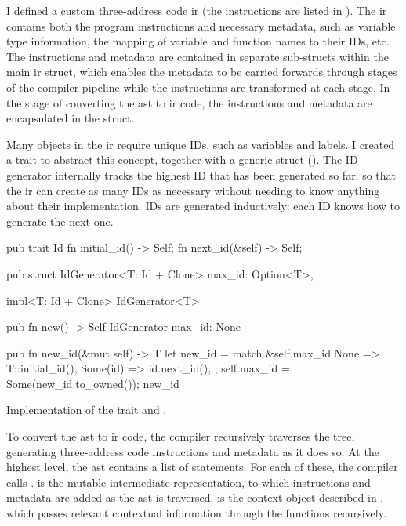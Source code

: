 \documentclass[00-main.tex]{subfiles}
\begin{document}
I defined a custom three-address code \gls{ir} (the instructions are listed in ).
The \gls{ir} contains both the program instructions and necessary metadata, such as variable type information, the mapping of variable and function names to their IDs, etc.
The instructions and metadata are contained in separate sub-structs within the main \gls{ir} struct, which enables the metadata to be carried forwards through stages of the compiler pipeline while the instructions are transformed at each stage.
In the stage of converting the \gls{ast} to \gls{ir} code, the instructions and metadata are encapsulated in the  struct.

Many objects in the \gls{ir} require unique IDs, such as variables and labels.
I created a  trait to abstract this concept, together with a generic  struct ().
The ID generator internally tracks the highest ID that has been generated so far, so that the \gls{ir} can create as many IDs as necessary without needing to know anything about their implementation.
IDs are generated inductively: each ID knows how to generate the next one.

\begin{listing}[!ht]
  \begin{RustListing}
    pub trait Id {
        fn initial_id() -> Self;
        fn next_id(&self) -> Self;
    }

    pub struct IdGenerator<T: Id + Clone> {
        max_id: Option<T>,
    }

    impl<T: Id + Clone> IdGenerator<T> {
        pub fn new() -> Self {
            IdGenerator { max_id: None }
        }

        pub fn new_id(&mut self) -> T {
            let new_id = match &self.max_id {
                None => T::initial_id(),
                Some(id) => id.next_id(),
            };
            self.max_id = Some(new_id.to_owned());
            new_id
        }
    }
  \end{RustListing}
  \caption{Implementation of the  trait and .}
  \label{lst:Id and IdGenerator implementation}
\end{listing}


To convert the \gls{ast} to \gls{ir} code, the compiler recursively traverses the tree, generating three-address code instructions and metadata as it does so.
At the highest level, the \gls{ast} contains a list of statements.
For each of these, the compiler calls . %
 is the mutable intermediate representation, to which instructions and metadata are added as the \gls{ast} is traversed.
 is the context object described in , which passes relevant contextual information through the functions recursively.
\end{document}

